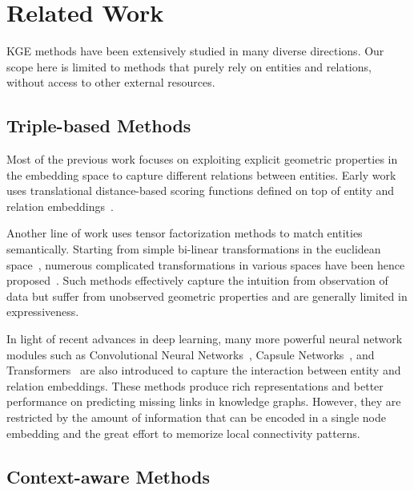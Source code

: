 \documentclass[11pt]{article}
\begin{document}
 \section{Related Work}
\label{sec:related}

KGE methods have been extensively studied in many diverse directions. Our scope here is limited to methods that purely rely on entities and relations, without access to other external resources.

\subsection{Triple-based Methods}

Most of the previous work focuses on exploiting explicit geometric properties in the embedding space to capture different relations between entities.
Early work uses translational distance-based scoring functions defined on top of entity and relation embeddings~\cite{bordes2013transe,wang2014transh,lin2015tranr,ji-etal-2015-knowledge}.

Another line of work uses tensor factorization methods to match entities semantically. Starting from simple bi-linear transformations in the euclidean space~\cite{nickel2011rescal,yang2014distmult}, numerous complicated transformations in various spaces have been hence proposed~\cite{trouillon2016complexe,ebisu2018toruse,sun2018rotate,zhang2019quaternion,chami-etal-2020-low,tang-etal-2020-orthogonal,chao-etal-2021-pairre}. Such methods effectively capture the intuition from observation of data but suffer from unobserved geometric properties and are generally limited in expressiveness.

In light of recent advances in deep learning, many more powerful neural network modules such as Convolutional Neural Networks~\cite{dettmers2018conve}, Capsule Networks~\cite{nguyen-etal-2019-capsule}, and Transformers~\cite{wang2019coke} are also introduced to capture the interaction between entity and relation embeddings.
These methods produce rich representations and better performance on predicting missing links in knowledge graphs.
However, they are restricted by the amount of information that can be encoded in a single node embedding and the great effort to memorize local connectivity patterns. 

\subsection{Context-aware Methods}
\end{document}
